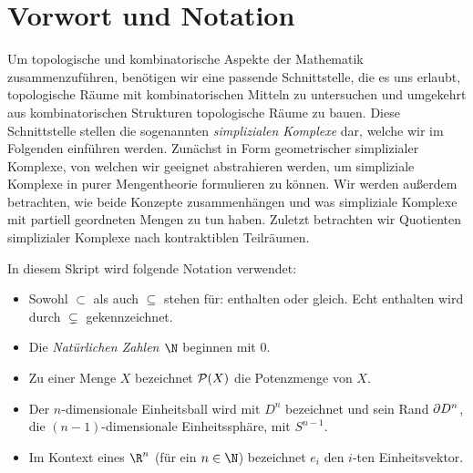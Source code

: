
\chapter{Vorwort und Notation}
Um topologische und kombinatorische Aspekte der Mathematik zusammenzuführen,
benötigen wir eine passende Schnittstelle, die es uns erlaubt, topologische
Räume mit kombinatorischen Mitteln zu untersuchen und umgekehrt aus
kombinatorischen Strukturen topologische Räume zu bauen. Diese Schnittstelle
stellen die sogenannten \emph{simplizialen Komplexe} dar, welche wir im
Folgenden einführen werden. Zunächst in Form geometrischer simplizialer
Komplexe, von welchen wir geeignet abstrahieren werden, um simpliziale Komplexe
in purer Mengentheorie formulieren zu können. Wir werden außerdem betrachten,
wie beide Konzepte zusammenhängen und was simpliziale Komplexe mit partiell
geordneten Mengen zu tun haben. Zuletzt betrachten wir Quotienten simplizialer
Komplexe nach kontraktiblen Teilräumen.


\bigskip
In diesem Skript wird folgende Notation verwendet:
\begin{itemize}
    \item
        Sowohl $\subset$ als auch $\subseteq$ stehen für: enthalten oder gleich.
        Echt enthalten wird durch $\subsetneq$ gekennzeichnet.
    
    \item
        Die \emph{Natürlichen Zahlen $\N$} beginnen mit $0$.
        
    \item
        Zu einer Menge $X$ bezeichnet $\operatorname{\mathcal{P}}(X)$ die Potenzmenge von $X$.

    \item %
        Der $n$-dimensionale Einheitsball wird mit $D^n$ bezeichnet und
        sein Rand $\partial D^n$, 
        die $(n{-}1)$-dimensionale Einheitssphäre, mit $S^{n-1}$.
        
    \item
        Im Kontext eines $\R^n$ (für ein $n\in\N$) bezeichnet $e_i$ den $i$-ten
        Einheitsvektor.
\end{itemize}










